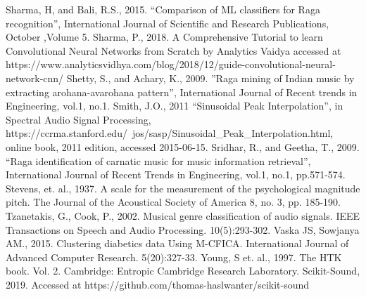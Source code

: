 Sharma, H, and Bali, R.S., 2015. “Comparison of ML classifiers for Raga recognition”, International Journal of Scientific and Research Publications, October ,Volume 5.
Sharma, P., 2018. A Comprehensive Tutorial to learn Convolutional Neural Networks from Scratch by Analytics Vaidya accessed at https://www.analyticsvidhya.com/blog/2018/12/guide-convolutional-neural-network-cnn/
Shetty, S., and Achary, K., 2009. ”Raga mining of Indian music by extracting arohana-avarohana pattern”, International Journal of Recent trends in Engineering, vol.1, no.1.
Smith, J.O., 2011 ``Sinusoidal Peak Interpolation'', in Spectral Audio Signal Processing, https://ccrma.stanford.edu/~jos/sasp/Sinusoidal_Peak_Interpolation.html, online book, 2011 edition, accessed 2015-06-15.
Sridhar, R., and Geetha, T., 2009. “Raga identification of carnatic music for music information retrieval”, International Journal of Recent Trends in Engineering, vol.1, no.1, pp.571-574.
Stevens, et. al., 1937. A scale for the measurement of the psychological magnitude pitch. The Journal of the Acoustical Society of America 8, no. 3, pp. 185-190.
Tzanetakis, G., Cook, P., 2002. Musical genre classification of audio signals. IEEE Transactions on Speech and Audio Processing. 10(5):293-302.
Vaska JS, Sowjanya AM., 2015. Clustering diabetics data Using M-CFICA. International Journal of Advanced Computer Research. 5(20):327-33.
Young, S et. al., 1997. The HTK book. Vol. 2. Cambridge: Entropic Cambridge Research Laboratory.
Scikit-Sound, 2019. Accessed at https://github.com/thomas-haslwanter/scikit-sound
